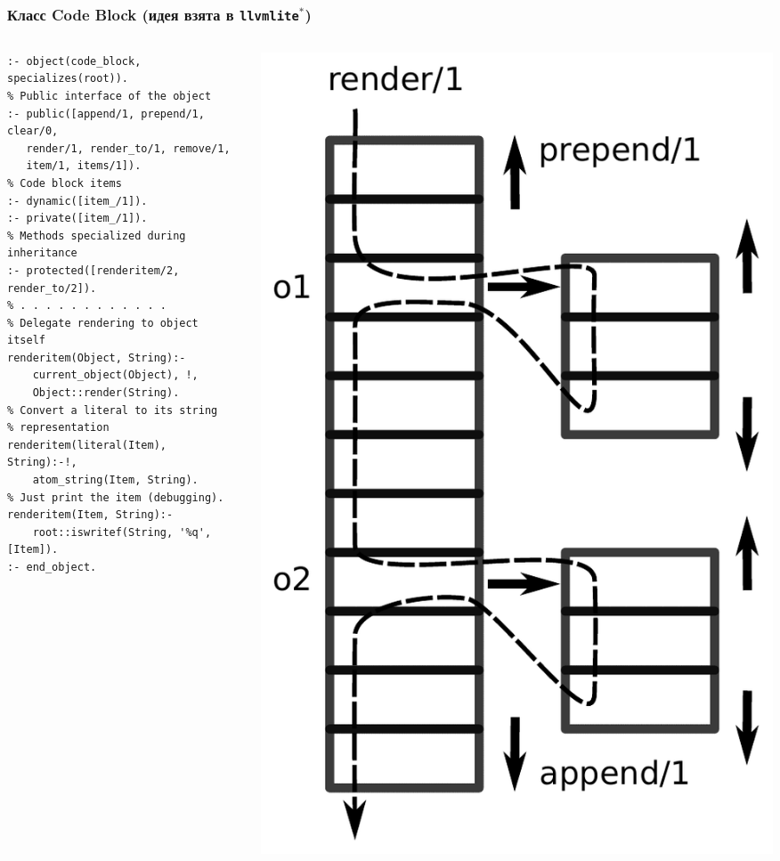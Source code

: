 \documentclass[10pt]{beamer}
\begin{document}
\begin{frame}[fragile] \frametitle{Класс Code Block (идея взята в \texttt{llvmlite}${}^*$)}
  \begin{columns}
    \begin{column}{0.6\textwidth}
      \flushleft
\begin{verbatim}
:- object(code_block, specializes(root)).
% Public interface of the object
:- public([append/1, prepend/1, clear/0,
   render/1, render_to/1, remove/1,
   item/1, items/1]).
% Code block items
:- dynamic([item_/1]).
:- private([item_/1]).
% Methods specialized during inheritance
:- protected([renderitem/2, render_to/2]).
% . . . . . . . . . . . .
% Delegate rendering to object itself
renderitem(Object, String):-
    current_object(Object), !,
    Object::render(String).
% Convert a literal to its string
% representation
renderitem(literal(Item), String):-!,
    atom_string(Item, String).
% Just print the item (debugging).
renderitem(Item, String):-
    root::iswritef(String, '%q', [Item]).
:- end_object.
\end{verbatim}
    \end{column}
    \begin{column}{0.4\textwidth}
      \includegraphics[width=1\linewidth]{code_block.pdf}

\end{column}
\end{columns}
\end{frame}
\end{document}
